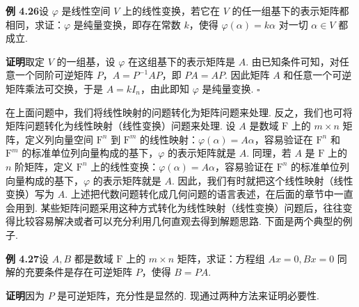 \documentclass[UTF8,12pt,a4paper,fontset=fandol]{ctexart}
\begin{document}
\noindent\textbf{例 4.26}\quad 设 $\varphi$ 是线性空间 $V$ 上的线性变换，若它在 $V$ 的任一组基下的表示矩阵都相同，求证：$\varphi$ 是纯量变换，即存在常数 $k$，使得 $\varphi(\alpha)=k\alpha$ 对一切 $\alpha\in V$ 都成立.

\noindent\textbf{证明}\quad 取定 $V$ 的一组基，设 $\varphi$ 在这组基下的表示矩阵是 $A$. 由已知条件可知，对任意一个同阶可逆矩阵 $P$，$A=P^{-1}AP$，即 $PA=AP$. 因此矩阵 $A$ 和任意一个可逆矩阵乘法可交换，于是 $A=kI_n$，由此即知 $\varphi$ 是纯量变换. $\square$

在上面问题中，我们将线性映射的问题转化为矩阵问题来处理. 反之，我们也可将矩阵问题转化为线性映射（线性变换）问题来处理. 设 $A$ 是数域 $\mathrm{F}$ 上的 $m\times n$ 矩阵，定义列向量空间 $\mathrm{F}^n$ 到 $\mathrm{F}^m$ 的线性映射：$\varphi(\alpha)=A\alpha$，容易验证在 $\mathrm{F}^n$ 和 $\mathrm{F}^m$ 的标准单位列向量构成的基下，$\varphi$ 的表示矩阵就是 $A$. 同理，若 $A$ 是 $\mathrm{F}$ 上的 $n$ 阶矩阵，定义 $\mathrm{F}^n$ 上的线性变换：$\varphi(\alpha)=A\alpha$，容易验证在 $\mathrm{F}^n$ 的标准单位列向量构成的基下，$\varphi$ 的表示矩阵就是 $A$. 因此，我们有时就把这个线性映射（线性变换）写为 $A$. 上述把代数问题转化成几何问题的语言表述，在后面的章节中一直会用到. 某些矩阵问题采用这种方式转化为线性映射（线性变换）问题后，往往变得比较容易解决或者可以充分利用几何直观去得到解题思路. 下面是两个典型的例子.

\noindent\textbf{例 4.27}\quad 设 $A,B$ 都是数域 $\mathrm{F}$ 上的 $m\times n$ 矩阵，求证：方程组 $Ax=0,Bx=0$ 同解的充要条件是存在可逆矩阵 $P$，使得 $B=PA$.

\noindent\textbf{证明}\quad 因为 $P$ 是可逆矩阵，充分性是显然的. 现通过两种方法来证明必要性.
\end{document}
